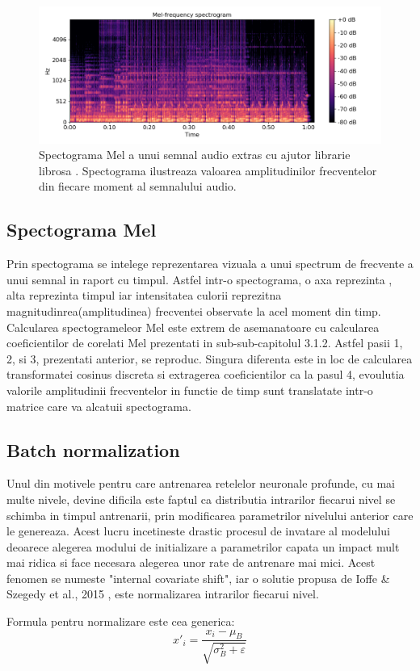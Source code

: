 \documentclass[a4paper,12pt]{book}
\begin{document}
			\begin{figure}[h]
				\centering
				\includegraphics[scale=0.67]{melspectogram}
				\caption{Spectograma Mel a unui semnal audio extras cu ajutor librarie librosa \cite{librosa}. Spectograma ilustreaza valoarea amplitudinilor frecventelor din fiecare moment al semnalului audio.}
				\label{fig:melspec}
			\end{figure}
			
			\subsection{Spectograma Mel} \label{mel}
				Prin spectograma se intelege reprezentarea vizuala a unui spectrum de frecvente a unui semnal in raport cu timpul. Astfel intr-o spectograma, o axa reprezinta , alta reprezinta timpul iar intensitatea culorii reprezitna magnitudinrea(amplitudinea) frecventei observate la acel moment din timp. Calcularea spectogrameleor Mel este extrem de asemanatoare cu calcularea coeficientilor de corelati Mel prezentati in sub-sub-capitolul 3.1.2. Astfel pasii 1, 2, si 3, prezentati anterior, se reproduc. Singura diferenta este in loc de calcularea transformatei cosinus discreta si extragerea coeficientilor ca la pasul 4, evoulutia valorile amplitudinii frecventelor in functie de timp sunt translatate intr-o matrice care va alcatuii spectograma. \par
			\subsection{Batch normalization} \label{batch-norn}
				Unul din motivele pentru care antrenarea retelelor neuronale profunde, cu mai multe nivele, devine dificila este faptul ca distributia intrarilor fiecarui nivel se schimba in timpul antrenarii, prin modificarea parametrilor nivelului anterior care le genereaza. Acest lucru incetineste drastic procesul de invatare al modelului deoarece alegerea modului de initializare a parametrilor capata un impact mult mai ridica si face necesara alegerea unor rate de antrenare mai mici. Acest fenomen se numeste "internal covariate shift", iar o solutie propusa de Ioffe \& Szegedy et al., 2015 \cite{batch_norm}, este normalizarea intrarilor fiecarui nivel. \par
				Formula pentru normalizare este cea generica:
				\begin{equation*}
					x'_i = \frac{x_i - \mu_B}{\sqrt{\sigma^2_B +  \varepsilon}}
				\end{equation*}
				
\end{document}
